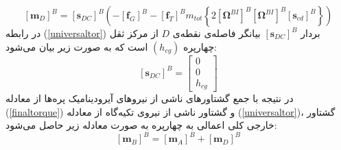 \begin{equation}\label{universaltor}
	\left[\boldsymbol m_D\right]^B = \left[\boldsymbol s_{DC}\right]^B\left(
	-\left[\boldsymbol f_G\right]^B
	-\left[\boldsymbol f_T\right]^B
	m_{tot}\left\{2
	\left[\boldsymbol \Omega^{BI}\right]^B
	\left[\boldsymbol \Omega^{BI}\right]^B
	\left[\boldsymbol s_{cd}\right]^B
	\right\}
	\right)
\end{equation}
در رابطه
(\ref{universaltor})
بردار 
$\left[\boldsymbol s_{DC}\right]^B$
بیانگر فاصله‌ی نقطه‌ی 
$D$
از مرکز ثقل چهارپره 
$(h_{cg})$
است که به صورت زیر بیان می‌شود:
\begin{equation}
	\left[\boldsymbol s_{DC}\right]^B = \begin{bmatrix}
		0\\0\\h_{cg}
	\end{bmatrix}
\end{equation}
 در نتیجه با جمع گشتاورهای ناشی از نیروهای آیرودینامیک پره‌ها از معادله 
(\ref{finaltorque})
 و گشتاور ناشی 
از نیروی تكیه‌گاه از معادله 
(\ref{universaltor})، گشتاور خارجی کلی اعمالی به چهارپره به صورت معادله زیر حاصل 
می‌شود:
\begin{equation}\label{finalm}
	\left[\boldsymbol m_B\right]^B = 
	\left[\boldsymbol m_A\right]^B+
	\left[\boldsymbol m_D\right]^B
\end{equation}

